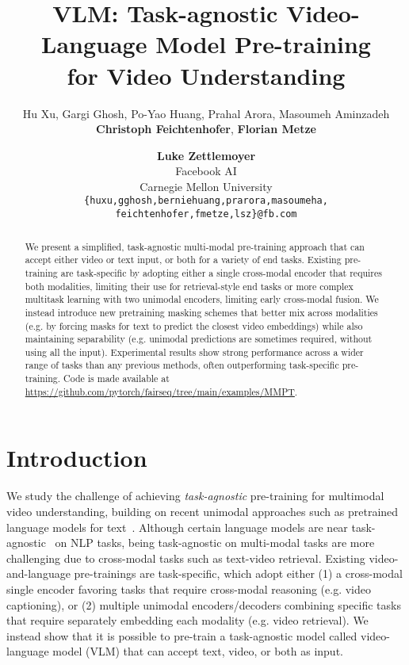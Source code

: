 \documentclass[11pt,a4paper]{article}
\title{VLM: Task-agnostic Video-Language Model Pre-training\\for Video Understanding}
\date{}
\author{Hu Xu, Gargi Ghosh, Po-Yao Huang, Prahal Arora, Masoumeh Aminzadeh \\ 
\textbf{Christoph Feichtenhofer}, \textbf{Florian Metze} \and \textbf{Luke Zettlemoyer} \\
Facebook AI\\
Carnegie Mellon University\\
\texttt{\{huxu,gghosh,berniehuang,prarora,masoumeha,}\\
\texttt{feichtenhofer,fmetze,lsz\}@fb.com}
}
\begin{document}
\maketitle
\begin{abstract}


We present a simplified, task-agnostic multi-modal pre-training approach that can accept either video or text input, or both for a variety of end tasks.
Existing pre-training are task-specific by adopting either a single cross-modal encoder that requires both modalities, limiting their use for retrieval-style end tasks or more complex multitask learning with two unimodal encoders, limiting early cross-modal fusion.
We instead introduce new pretraining masking schemes that better mix across modalities (e.g. by forcing masks for text to predict the closest video embeddings) while also maintaining separability (e.g. unimodal predictions are sometimes required, without using all the input).
Experimental results show strong performance across a wider range of tasks than any previous methods, often outperforming task-specific pre-training. Code is made available at \url{https://github.com/pytorch/fairseq/tree/main/examples/MMPT}. 


\end{abstract}

\section{Introduction}
\label{sec:intro}








We study the challenge of achieving \textit{task-agnostic} pre-training for multimodal video understanding, building on recent unimodal approaches such as pretrained language models for text~\cite{peters-etal-2018-deep,devlin-etal-2019-bert}.
Although certain language models are near task-agnostic~\cite{devlin-etal-2019-bert,lewis-etal-2020-bart} on NLP tasks,
being task-agnostic on multi-modal tasks are more challenging due to cross-modal tasks such as text-video retrieval.
Existing video-and-language pre-trainings are task-specific, which adopt either (1) a cross-modal single encoder  \cite{sun2019videobert,sun2019contrastive,zhu2020actbert} favoring tasks that require cross-modal reasoning (e.g. video captioning), 
or (2) multiple unimodal encoders/decoders \cite{miech2019howto100m,miech2020end,li-etal-2020-hero,luo2020univilm,korbar2020video} combining specific tasks that require separately embedding each modality (e.g. video retrieval). We instead show that it is possible to pre-train a task-agnostic model called video-language model (VLM) that can accept text, video, or both as input.
\end{document}
